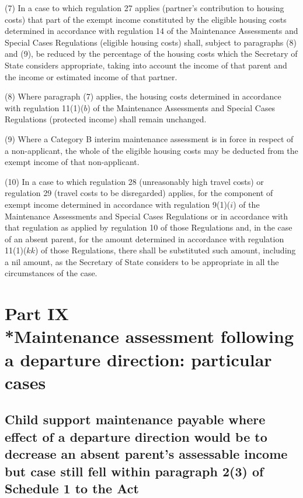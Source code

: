 \documentclass[a4paper]{article}
\newcommand{\parthead}{}
\begin{document}
(7) In a case to which regulation 27 applies (partner’s contribution to housing
costs) that part of the exempt income constituted by the eligible housing costs
determined in accordance with regulation 14 of the Maintenance Assessments and
Special Cases Regulations (eligible housing costs) shall, subject to paragraphs
(8) and (9), be reduced by the percentage of the housing costs which the
Secretary of State considers appropriate, taking into account the income of that
parent and the income or estimated income of that partner.

(8) Where paragraph (7) applies, the housing costs determined in accordance with
regulation 11(1)($b$) of the Maintenance Assessments and Special Cases Regulations
(protected income) shall remain unchanged.

(9) Where a Category B interim maintenance assessment is in force in respect of
a non-applicant, the whole of the eligible housing costs may be deducted from
the exempt income of that non-applicant.

(10) In a case to which regulation 28 (unreasonably high travel costs) or
regulation 29 (travel costs to be disregarded) applies, for the component of
exempt income determined in accordance with regulation 9(1)($i$) of the
Maintenance Assessments and Special Cases Regulations or in accordance with that
regulation as applied by regulation 10 of those Regulations and, in the case of
an absent parent, for the amount determined in accordance with regulation
11(1)($kk$) of those Regulations, there shall be substituted such amount,
including a nil amount, as the Secretary of State considers to be appropriate in
all the circumstances of the case.

\section[Part IX --- Maintenance assessment following a departure direction: particular cases]{Part IX\\*Maintenance assessment following a departure direction: particular cases}

\renewcommand\parthead{--- Part IX}

\subsection[41. Child support maintenance payable where effect of a departure direction
would be to decrease an absent parent’s assessable income but case still fell
within paragraph 2(3) of Schedule 1 to the Act]{Child support maintenance payable where effect of a departure direction
would be to decrease an absent parent’s assessable income but case still fell
within paragraph 2(3) of Schedule 1 to the Act}
\end{document}
